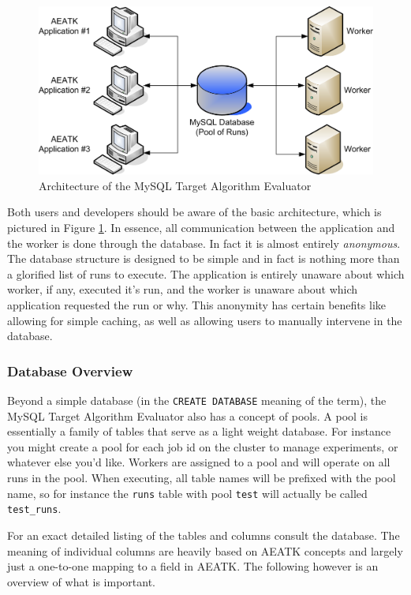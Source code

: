 \documentclass[11pt,letterpaper,oneside]{article}
\begin{document}
\begin{figure}
\centering
\includegraphics[scale=0.90]{img/Architecture/ArchitectureOverview}
\caption{Architecture of the MySQL Target Algorithm Evaluator}\label{arch}
\end{figure}

Both users and developers should be aware of the basic architecture, which is pictured in Figure \ref{arch}. In essence, all communication between the application and the worker is done through the database. In fact it is almost entirely \emph{anonymous}. The database structure is designed to be simple and in fact is nothing more than a glorified list of runs to execute. The application is entirely unaware about which worker, if any, executed it's run, and the worker is unaware about which application requested the run or why.  This anonymity has certain benefits like allowing for simple caching, as well as allowing users to manually intervene in the database.

\subsubsection{Database Overview} 

Beyond a simple database (in the \texttt{CREATE DATABASE} meaning of the term), the MySQL Target Algorithm Evaluator also has a concept of pools. A pool is essentially a family of tables that serve as a light weight database. For instance you might create a pool for each job id on the cluster to manage experiments, or whatever else you'd like. Workers are assigned to a pool and will operate on all runs in the pool. When executing, all table names will be prefixed with the pool name, so for instance the \texttt{runs} table with pool \texttt{test} will actually be called \texttt{test\_runs}.

For an exact detailed listing of the tables and columns consult the database. The meaning of individual columns are heavily  based on AEATK concepts and largely just a one-to-one mapping to a field in AEATK.  The following however is an overview of what is important.
\end{document}

